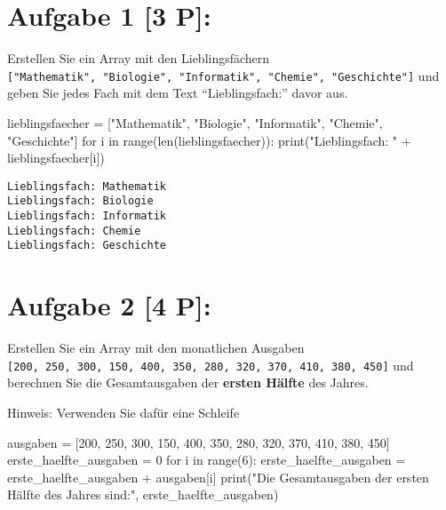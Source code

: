 \documentclass[
  letterpaper,
  DIV=11,
  numbers=noendperiod]{scrartcl}
\author{}
\date{}
\newenvironment{Shaded}{\begin{snugshade}}{\end{snugshade}}
\newcommand{\BuiltInTok}[1]{\textcolor[rgb]{0.00,0.23,0.31}{#1}}
\newcommand{\ControlFlowTok}[1]{\textcolor[rgb]{0.00,0.23,0.31}{#1}}
\newcommand{\DecValTok}[1]{\textcolor[rgb]{0.68,0.00,0.00}{#1}}
\newcommand{\KeywordTok}[1]{\textcolor[rgb]{0.00,0.23,0.31}{#1}}
\newcommand{\NormalTok}[1]{\textcolor[rgb]{0.00,0.23,0.31}{#1}}
\newcommand{\OperatorTok}[1]{\textcolor[rgb]{0.37,0.37,0.37}{#1}}
\newcommand{\StringTok}[1]{\textcolor[rgb]{0.13,0.47,0.30}{#1}}
\begin{document}
\section{Aufgabe 1 {[}3 P{]}:}\label{aufgabe-1-3-p}

Erstellen Sie ein Array mit den Lieblingsfächern
\texttt{{[}"Mathematik",\ "Biologie",\ "Informatik",\ "Chemie",\ "Geschichte"{]}}
und geben Sie jedes Fach mit dem Text ``Lieblingsfach:'' davor aus.

\begin{Shaded}
\begin{Highlighting}[]
\NormalTok{lieblingsfaecher }\OperatorTok{=}\NormalTok{ [}\StringTok{"Mathematik"}\NormalTok{, }\StringTok{"Biologie"}\NormalTok{, }\StringTok{"Informatik"}\NormalTok{, }\StringTok{"Chemie"}\NormalTok{, }\StringTok{"Geschichte"}\NormalTok{]}
\ControlFlowTok{for}\NormalTok{ i }\KeywordTok{in} \BuiltInTok{range}\NormalTok{(}\BuiltInTok{len}\NormalTok{(lieblingsfaecher)):}
    \BuiltInTok{print}\NormalTok{(}\StringTok{"Lieblingsfach: "} \OperatorTok{+}\NormalTok{ lieblingsfaecher[i])}
\end{Highlighting}
\end{Shaded}

\begin{verbatim}
Lieblingsfach: Mathematik
Lieblingsfach: Biologie
Lieblingsfach: Informatik
Lieblingsfach: Chemie
Lieblingsfach: Geschichte
\end{verbatim}

\section{Aufgabe 2 {[}4 P{]}:}\label{aufgabe-2-4-p}

Erstellen Sie ein Array mit den monatlichen Ausgaben
\texttt{{[}200,\ 250,\ 300,\ 150,\ 400,\ 350,\ 280,\ 320,\ 370,\ 410,\ 380,\ 450{]}}
und berechnen Sie die Gesamtausgaben der \textbf{ersten Hälfte} des
Jahres.

Hinweis: Verwenden Sie dafür eine Schleife

\begin{Shaded}
\begin{Highlighting}[]
\NormalTok{ausgaben }\OperatorTok{=}\NormalTok{ [}\DecValTok{200}\NormalTok{, }\DecValTok{250}\NormalTok{, }\DecValTok{300}\NormalTok{, }\DecValTok{150}\NormalTok{, }\DecValTok{400}\NormalTok{, }\DecValTok{350}\NormalTok{, }\DecValTok{280}\NormalTok{, }\DecValTok{320}\NormalTok{, }\DecValTok{370}\NormalTok{, }\DecValTok{410}\NormalTok{, }\DecValTok{380}\NormalTok{, }\DecValTok{450}\NormalTok{]}
\NormalTok{erste\_haelfte\_ausgaben }\OperatorTok{=} \DecValTok{0}
\ControlFlowTok{for}\NormalTok{ i }\KeywordTok{in} \BuiltInTok{range}\NormalTok{(}\DecValTok{6}\NormalTok{):}
\NormalTok{    erste\_haelfte\_ausgaben }\OperatorTok{=}\NormalTok{ erste\_haelfte\_ausgaben }\OperatorTok{+}\NormalTok{ ausgaben[i]}
\BuiltInTok{print}\NormalTok{(}\StringTok{"Die Gesamtausgaben der ersten Hälfte des Jahres sind:"}\NormalTok{, erste\_haelfte\_ausgaben)}
\end{Highlighting}
\end{Shaded}
\end{document}

